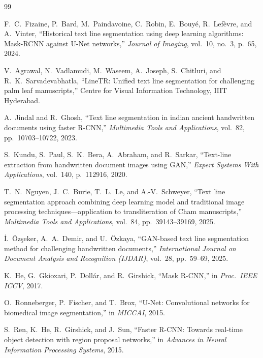 \documentclass[11pt, a4paper]{article}
\begin{document}
\begin{thebibliography}{99}

F.~C.~Fizaine, P.~Bard, M.~Paindavoine, C.~Robin, E.~Bouy\'e, R.~Lef\`evre, and A.~Vinter,
``Historical text line segmentation using deep learning algorithms: Mask-RCNN against U-Net networks,''
\textit{Journal of Imaging}, vol.~10, no.~3, p.~65, 2024.

V.~Agrawal, N.~Vadlamudi, M.~Waseem, A.~Joseph, S.~Chitluri, and R.~K.~Sarvadevabhatla,
``LineTR: Unified text line segmentation for challenging palm leaf manuscripts,''
Centre for Visual Information Technology, IIIT Hyderabad.

A.~Jindal and R.~Ghosh,
``Text line segmentation in indian ancient handwritten documents using faster R-CNN,''
\textit{Multimedia Tools and Applications}, vol.~82, pp.~10703--10722, 2023.

S.~Kundu, S.~Paul, S.~K.~Bera, A.~Abraham, and R.~Sarkar,
``Text-line extraction from handwritten document images using GAN,''
\textit{Expert Systems With Applications}, vol.~140, p.~112916, 2020.

T.~N.~Nguyen, J.~C.~Burie, T.~L.~Le, and A.-V.~Schweyer,
``Text line segmentation approach combining deep learning model and traditional image processing techniques---application to transliteration of Cham manuscripts,''
\textit{Multimedia Tools and Applications}, vol.~84, pp.~39143--39169, 2025.

\.{I}.~\"Oz\c{s}eker, A.~A.~Demir, and U.~\"Ozkaya,
``GAN-based text line segmentation method for challenging handwritten documents,''
\textit{International Journal on Document Analysis and Recognition (IJDAR)}, vol.~28, pp.~59--69, 2025.

K.~He, G.~Gkioxari, P.~Doll\'{a}r, and R.~Girshick,
``Mask R-CNN,''
in \textit{Proc.\ IEEE ICCV}, 2017.

O.~Ronneberger, P.~Fischer, and T.~Brox,
``U-Net: Convolutional networks for biomedical image segmentation,''
in \textit{MICCAI}, 2015.

S.~Ren, K.~He, R.~Girshick, and J.~Sun,
``Faster R-CNN: Towards real-time object detection with region proposal networks,''
in \textit{Advances in Neural Information Processing Systems}, 2015.


\end{thebibliography}
\end{document}
